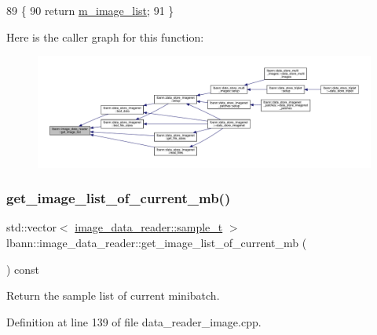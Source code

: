 \begin{DoxyCode}
89                                                     \{
90     \textcolor{keywordflow}{return} \hyperlink{classlbann_1_1image__data__reader_ae3fc949bd08c45ceafb1a03503261008}{m\_image\_list};
91   \}
\end{DoxyCode}
Here is the caller graph for this function\+:\nopagebreak
\begin{figure}[H]
\begin{center}
\leavevmode
\includegraphics[width=350pt]{classlbann_1_1image__data__reader_aa03599a5f66d498d4bb90c50ae70c82a_icgraph}
\end{center}
\end{figure}
\mbox{\label{classlbann_1_1image__data__reader_a9624d37e076cf71154b65910dd7e1195}} 
\subsubsection{\texorpdfstring{get\+\_\+image\+\_\+list\+\_\+of\+\_\+current\+\_\+mb()}{get\_image\_list\_of\_current\_mb()}}
{\footnotesize\ttfamily std\+::vector$<$ \hyperlink{classlbann_1_1image__data__reader_a7580011ef6ef9da32e1a3bc49ad0706c}{image\+\_\+data\+\_\+reader\+::sample\+\_\+t} $>$ lbann\+::image\+\_\+data\+\_\+reader\+::get\+\_\+image\+\_\+list\+\_\+of\+\_\+current\+\_\+mb (\begin{DoxyParamCaption}{ }\end{DoxyParamCaption}) const}



Return the sample list of current minibatch. 



Definition at line 139 of file data\+\_\+reader\+\_\+image.\+cpp.


